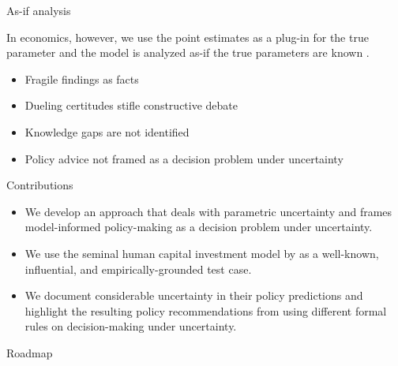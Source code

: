 \begin{frame}{As-if analysis}\vspace{0.3cm}

In economics, however, we use the point estimates as a plug-in for the true parameter and the model is analyzed as-if the true parameters are known \citep{Manski.2021}.\vspace{0.3cm}
\pause
    \vspace{0.3cm}
  	\begin{itemize}\setlength\itemsep{1em}
  	\item Fragile findings as facts
  	\item Dueling certitudes stifle constructive debate
  	\item Knowledge gaps are not identified\pause
    \item {\color{red} Policy advice not framed as a decision problem under uncertainty}
  	\end{itemize}

    {\vspace{7.5pt} \hyperlink{Examples of as-if analysis}{}}

\end{frame}
\begin{frame}{Contributions}\vspace{0.3cm}
  	\begin{itemize}\setlength\itemsep{1em}
    	\item We develop an approach that deals with parametric uncertainty and frames model-informed policy-making as a decision
problem under uncertainty.
    \pause
    \item We use the seminal human capital investment model by \citet{Keane.1997} as a well-known, influential, and empirically-grounded test case.
    \pause
    \item We document considerable uncertainty in their policy predictions and highlight the resulting policy recommendations from using different formal rules on decision-making under uncertainty.
  	\end{itemize}
\end{frame}
\begin{frame}{Roadmap}
\vspace{1cm}
\tableofcontents
\end{frame}
